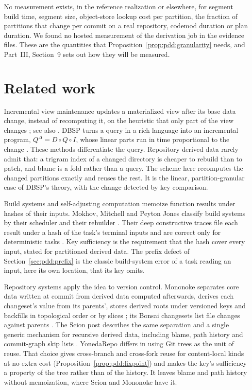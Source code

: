 \documentclass[11pt,letterpaper]{article}
\theoremstyle{definition}
\theoremstyle{remark}
\begin{document}
No measurement exists, in the reference realization or elsewhere, for segment build time, segment size, object-store lookup cost per partition, the fraction of partitions that change per commit on a real repository, codemod duration or plan duration. We found no hosted measurement of the derivation job in the evidence files. These are the quantities that Proposition~\ref{prop:pdd:granularity} needs, and Part~III, Section~9 sets out how they will be measured.

\section{Related work}
\label{sec:pdd:related}

Incremental view maintenance updates a materialized view after its base data change, instead of recomputing it, on the heuristic that only part of the view changes \cite[Section~1]{gupta1995maintenance}; see also \cite{blakeley1986views,gupta1993views}. DBSP turns a query in a rich language into an incremental program, $Q^\Delta=D\circ Q\circ I$, whose linear parts run in time proportional to the change \cite{budiu2023dbsp}. These methods differentiate the query. Repository derived data rarely admit that: a trigram index of a changed directory is cheaper to rebuild than to patch, and blame is a fold rather than a query. The scheme here recomputes the changed partitions exactly and reuses the rest. It is the linear, partition-granular case of DBSP's theory, with the change detected by key comparison.

Build systems and self-adjusting computation memoize function results under hashes of their inputs. Mokhov, Mitchell and Peyton Jones classify build systems by their scheduler and their rebuilder \cite{mokhov2018build}. Their deep constructive traces file each result under a hash of the task's terminal inputs and are correct only for deterministic tasks \cite[Section~4.2.4]{mokhov2018build}. Key sufficiency is the requirement that the hash cover every input, stated for partitioned derived data. The prefix defect of Section~\ref{sec:pdd:prefix} is the classic build-system error of a task reading an input, here its own location, that its key omits.

Repository systems apply the idea to version control. Mononoke separates core data written at commit from derived data computed afterwards, derives each changeset's value from its parents', stores derived roots under versioned keys and backfills in topological order or by slices \cite{mononokederived}; its Bonsai changesets list file changes against parents \cite{mononokebonsai}. The Scion post describes the same separation and a single generic mechanism for recursive derived data, including blame, path history and commit-graph skip lists \cite{anthropic2026scion}. YonedaRepo differs in using Git trees as the unit of reuse. That choice gives cross-branch and cross-fork reuse for content-local kinds at no extra cost (Proposition~\ref{prop:pdd:fixpoint}) and makes the key's sufficiency a property of the tree rather than of the history. It leaves blame and path history without memoization, where Scion and Mononoke have it.
\end{document}
